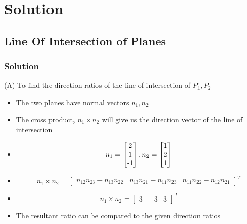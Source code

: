\documentclass{beamer}
\begin{document}
\section{Solution}
\subsection{Line Of Intersection of Planes}
\begin{frame}
\frametitle{Solution}

(A) To find the direction ratios of the line of intersection of $P_{1},P_{2}$
\begin{itemize}
\item<1-> The two planes have normal vectors $n_{1},n_{2}$
\item<2-> The cross product, $n_{1}\times n_{2}$ will give us the direction vector of the line of intersection
\item <3->
\[  n_{1}=
    \begin{bmatrix}
    $2$\\$1$\\$-1$
    \end{bmatrix}
    ,n_{2}=
    \begin{bmatrix}
    $1$\\$2$\\$1$
    \end{bmatrix}
\]
\item <4->
\[
    n_{1}\times n_{2}=
    \begin{bmatrix}
    n_{12}n_{23}-n_{13}n_{22} & n_{13}n_{21}-n_{11}n_{23} & n_{11}n_{22}-n_{12}n_{21}
    \end{bmatrix}^{T}
\]
\item <5->
\[
    n_{1}\times n_{2}=
    \begin{bmatrix}
    3 & -3 & 3
    \end{bmatrix}^{T}
\]
\item<6-> The resultant ratio can be compared to the given direction ratios
\end{itemize}
\end{frame}
\end{document}
